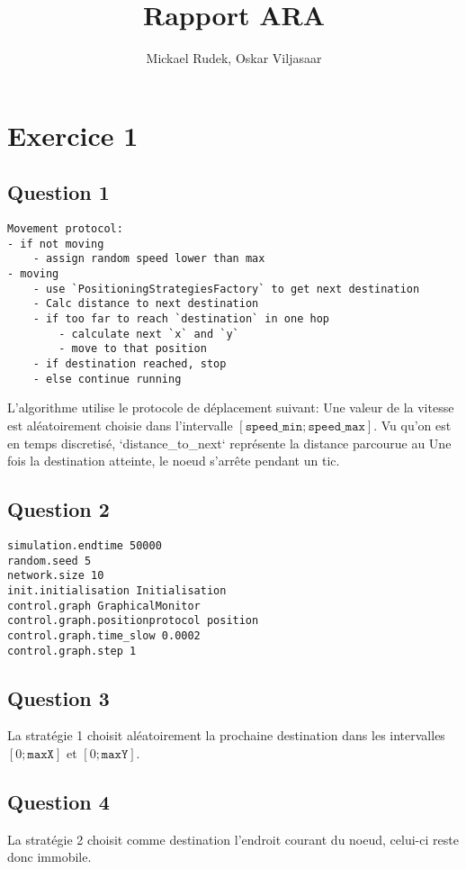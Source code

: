 \documentclass[a4paper]{article}
\title{Rapport ARA}
\author{Mickael Rudek, Oskar Viljasaar}
\begin{document}
\maketitle


\section{Exercice 1}
\subsection{Question 1}

\begin{verbatim}
Movement protocol:
- if not moving
    - assign random speed lower than max
- moving
    - use `PositioningStrategiesFactory` to get next destination
    - Calc distance to next destination
    - if too far to reach `destination` in one hop
        - calculate next `x` and `y`
        - move to that position
    - if destination reached, stop
    - else continue running
\end{verbatim}
L'algorithme utilise le protocole de déplacement suivant:
Une valeur de la vitesse est aléatoirement choisie dans l'intervalle
$ \left[ \texttt{speed\_min}; \texttt{speed\_max} \right] $.
Vu qu'on est en temps discretisé, `distance\_to\_next` représente la distance parcourue au
 Une fois la destination atteinte, le noeud s'arrête pendant un tic.


 \subsection{Question 2}

\begin{verbatim}
simulation.endtime 50000
random.seed 5
network.size 10
init.initialisation Initialisation
control.graph GraphicalMonitor
control.graph.positionprotocol position
control.graph.time_slow 0.0002
control.graph.step 1
\end{verbatim}

\subsection{Question 3}
La stratégie 1 choisit aléatoirement la prochaine destination dans les intervalles
$\left[ 0; \texttt{maxX} \right]$ et $\left[ 0; \texttt{maxY}
  \right]$.

\subsection{Question 4}
La stratégie 2 choisit comme destination l'endroit courant du noeud,
celui-ci reste donc immobile.
\end{document}
